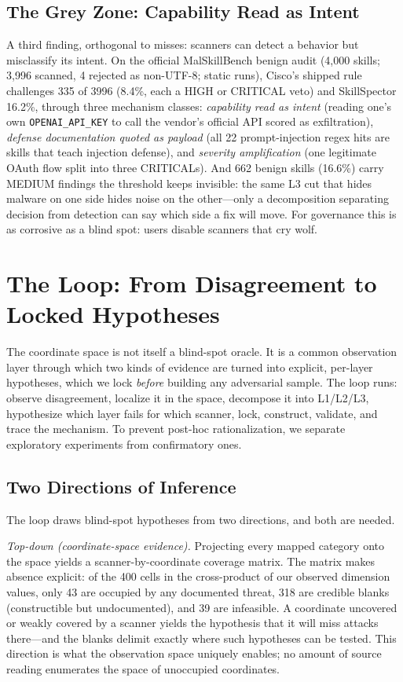 \documentclass[sigconf,nonacm]{acmart}
\begin{document}
\subsection{The Grey Zone: Capability Read as Intent}
A third finding, orthogonal to misses: scanners can detect a behavior but misclassify its intent. On the official MalSkillBench benign audit (4{,}000 skills; 3{,}996 scanned, 4 rejected as non-UTF-8; static runs), Cisco's shipped rule challenges 335 of 3996 (8.4\%, each a HIGH or CRITICAL veto) and SkillSpector 16.2\%, through three mechanism classes: \emph{capability read as intent} (reading one's own \texttt{OPENAI\_API\_KEY} to call the vendor's official API scored as exfiltration), \emph{defense documentation quoted as payload} (all 22 prompt-injection regex hits are skills that teach injection defense), and \emph{severity amplification} (one legitimate OAuth flow split into three CRITICALs). And 662 benign skills (16.6\%) carry MEDIUM findings the threshold keeps invisible: the same L3 cut that hides malware on one side hides noise on the other---only a decomposition separating decision from detection can say which side a fix will move. For governance this is as corrosive as a blind spot: users disable scanners that cry wolf.

\section{The Loop: From Disagreement to Locked Hypotheses}
\label{sec:hypotheses}

The coordinate space is not itself a blind-spot oracle. It is a common observation layer through which two kinds of evidence are turned into explicit, per-layer hypotheses, which we lock \emph{before} building any adversarial sample. The loop runs: observe disagreement, localize it in the space, decompose it into L1/L2/L3, hypothesize which layer fails for which scanner, lock, construct, validate, and trace the mechanism. To prevent post-hoc rationalization, we separate exploratory experiments from confirmatory ones.

\subsection{Two Directions of Inference}
The loop draws blind-spot hypotheses from two directions, and both are needed.

\emph{Top-down (coordinate-space evidence).} Projecting every mapped category onto the space yields a scanner-by-coordinate coverage matrix. The matrix makes absence explicit: of the 400 cells in the cross-product of our observed dimension values, only 43 are occupied by any documented threat, 318 are credible blanks (constructible but undocumented), and 39 are infeasible. A coordinate uncovered or weakly covered by a scanner yields the hypothesis that it will miss attacks there---and the blanks delimit exactly where such hypotheses can be tested. This direction is what the observation space uniquely enables; no amount of source reading enumerates the space of unoccupied coordinates.
\end{document}
